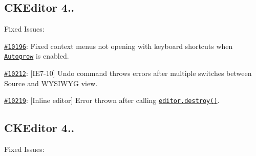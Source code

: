 {\ttfamily \subsection*{C\+K\+Editor 4..}}

{\ttfamily }

{\ttfamily Fixed Issues\+:}

{\ttfamily 
\begin{DoxyItemize}
\item \href{http://dev.ckeditor.com/ticket/10196}{\tt \#10196}\+: Fixed context menus not opening with keyboard shortcuts when \href{http://ckeditor.com/addon/autogrow}{\tt Autogrow} is enabled.
\item \href{http://dev.ckeditor.com/ticket/10212}{\tt \#10212}\+: \mbox{[}I\+E7-\/10\mbox{]} Undo command throws errors after multiple switches between Source and W\+Y\+S\+I\+W\+YG view.
\item \href{http://dev.ckeditor.com/ticket/10219}{\tt \#10219}\+: \mbox{[}Inline editor\mbox{]} Error thrown after calling \href{http://docs.ckeditor.com/#!/api/CKEDITOR.editor-method-destroy}{\tt {\ttfamily editor.\+destroy()}}.
\end{DoxyItemize}}

{\ttfamily \subsection*{C\+K\+Editor 4..}}

{\ttfamily }

{\ttfamily Fixed Issues\+:}

